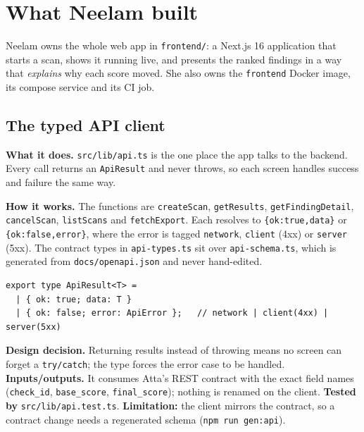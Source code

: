 

\maketitlepage
\tableofcontents
\clearpage


\clearpage

\section{What Neelam built}
Neelam owns the whole web app in \texttt{frontend/}: a Next.js 16 application
that starts a scan, shows it running live, and presents the ranked findings in a
way that \emph{explains} why each score moved. She also owns the \texttt{frontend}
Docker image, its compose service and its CI job.

\subsection{The typed API client}
\textbf{What it does.} \texttt{src/lib/api.ts} is the one place the app talks to
the backend. Every call returns an \texttt{ApiResult} and never throws, so each
screen handles success and failure the same way.

\textbf{How it works.} The functions are \texttt{createScan}, \texttt{getResults},
\texttt{getFindingDetail}, \texttt{cancelScan}, \texttt{listScans} and
\texttt{fetchExport}. Each resolves to \texttt{\{ok:true,data\}} or
\texttt{\{ok:false,error\}}, where the error is tagged \texttt{network},
\texttt{client} (4xx) or \texttt{server} (5xx). The contract types in
\texttt{api-types.ts} sit over \texttt{api-schema.ts}, which is generated from
\texttt{docs/openapi.json} and never hand-edited.

\begin{lstlisting}[caption={Errors are values, not exceptions (\texttt{src/lib/api.ts}).}]
export type ApiResult<T> =
  | { ok: true; data: T }
  | { ok: false; error: ApiError };   // network | client(4xx) | server(5xx)
\end{lstlisting}

\textbf{Design decision.} Returning results instead of throwing means no screen
can forget a \texttt{try/catch}; the type forces the error case to be handled.
\textbf{Inputs/outputs.} It consumes Atta's REST contract with the exact field
names (\texttt{check\_id}, \texttt{base\_score}, \texttt{final\_score}); nothing
is renamed on the client. \textbf{Tested by} \texttt{src/lib/api.test.ts}.
\textbf{Limitation:} the client mirrors the contract, so a contract change needs
a regenerated schema (\texttt{npm run gen:api}).

